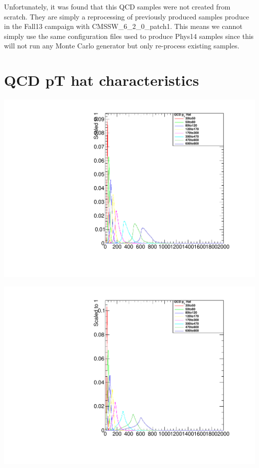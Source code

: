 \documentclass[a4paper]{article}
\begin{document}
Unfortunately, it was found that this QCD samples were not created from scratch. They are simply a reprocessing of previously produced samples produce in the Fall13 campaign with CMSSW\_6\_2\_0\_patch1. This means we cannot simply use the same configuration files used to produce Phys14 samples since this will not run any Monte Carlo generator but only re-process existing samples.  

\section{QCD pT hat characteristics}

\begin{minipage}{.5\textwidth}
  \centering
  \includegraphics[width=1.0\linewidth]{img/Jet0_Pt.pdf}
\end{minipage}%
\begin{minipage}{0.5\textwidth}
  \centering
  \includegraphics[width=1.0\linewidth]{img/Jet1_Pt.pdf}
\end{minipage}
\end{document}
